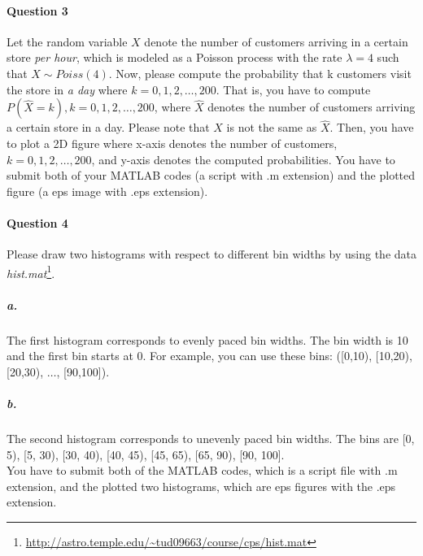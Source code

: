 \documentclass[11pt]{article} %
\begin{document}
\paragraph*{Question 3}
Let the random variable $X$ denote the number of customers arriving in a certain store {\it per hour}, which is modeled as a Poisson process with the rate $\lambda = 4$ such that $X \sim Poiss(4)$. Now, please compute the probability that k customers visit the store in {\it a day} where $k=0, 1, 2, \ldots, 200$. That is, you have to compute $P(\hat{X} = k), k = 0, 1, 2, \ldots, 200$, where $\hat{X}$ denotes the number of customers arriving a certain store in a day. Please note that $X$ is not the same as $\hat{X}$. Then, you have to plot a 2D figure where x-axis denotes the number of customers, $k = 0, 1, 2, \ldots, 200$, and y-axis denotes the computed probabilities. You have to submit both of your MATLAB codes (a script with .m extension) and the plotted figure (a eps image with .eps extension). 

\paragraph*{Question 4}
Please draw two histograms with respect to different bin widths by using the data {\it hist.mat}\footnote{\url{http://astro.temple.edu/~tud09663/course/cps/hist.mat}}. 
\subparagraph*{a.} The first histogram corresponds to evenly paced bin widths. The bin width is 10 and the first bin starts at 0. For example, you can use these bins: ([0,10), [10,20), [20,30), $\ldots$, [90,100]).
\subparagraph*{b.} The second histogram corresponds to unevenly paced bin widths. The bins are [0, 5), [5, 30), [30, 40), [40, 45), [45, 65), [65, 90), [90, 100]. \\

You have to submit both of the MATLAB codes, which is a script file with .m extension, and the plotted two histograms, which are eps figures with the .eps extension. 
\end{document}
